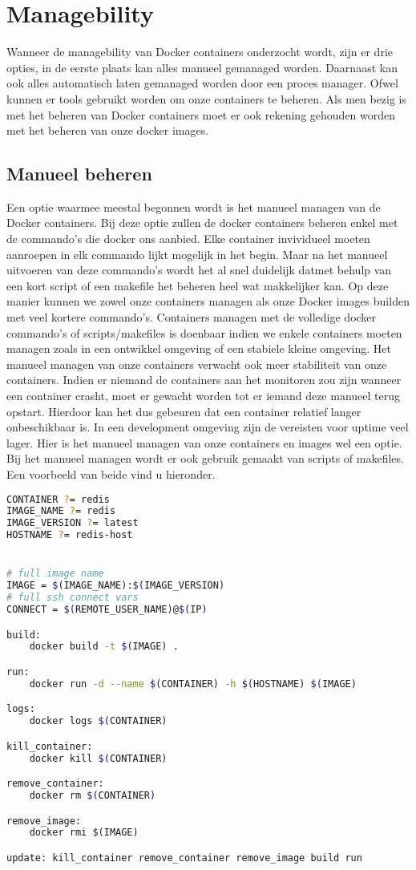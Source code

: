 \chapter{Managebility}

Wanneer de managebility van Docker containers onderzocht wordt, zijn er drie opties, in de eerste plaats kan alles manueel gemanaged worden. Daarnaast kan  ook alles automatisch laten gemanaged worden door een proces manager. Ofwel kunnen er tools gebruikt worden om onze containers te beheren. Als men bezig is met het beheren van Docker containers moet er ook rekening gehouden worden met het beheren van onze docker images. 

\section{Manueel beheren}

Een optie waarmee meestal begonnen wordt is het manueel managen van de Docker containers. Bij deze optie zullen de docker containers beheren enkel met de commando's die docker ons aanbied. Elke container invividueel moeten aanroepen in elk commando lijkt mogelijk in het begin. Maar na het manueel uitvoeren van deze commando's wordt het al snel duidelijk datmet behulp van een kort script of een makefile het beheren heel wat makkelijker kan. Op deze manier kunnen we zowel onze containers managen als onze Docker images builden met veel kortere commando's. Containers managen met de volledige docker commando's of scripts/makefiles is doenbaar indien we enkele containers moeten managen zoals in een ontwikkel omgeving of een stabiele kleine omgeving. Het manueel managen van onze containers verwacht ook meer stabiliteit van onze containers. Indien er niemand de containers aan het monitoren zou zijn wanneer een container crasht, moet er gewacht worden tot er iemand deze manueel terug opstart. Hierdoor kan het dus gebeuren dat een container relatief langer onbeschikbaar is. In een development omgeving zijn de vereisten voor uptime veel lager. Hier is het manueel managen van onze containers en images wel een optie. Bij het manueel managen wordt er ook gebruik gemaakt van scripts of makefiles. Een voorbeeld van beide vind u hieronder.

\begin{lstlisting}[language=bash, style=configstyle]
CONTAINER ?= redis
IMAGE_NAME ?= redis
IMAGE_VERSION ?= latest
HOSTNAME ?= redis-host


# full image name
IMAGE = $(IMAGE_NAME):$(IMAGE_VERSION)
# full ssh connect vars
CONNECT = $(REMOTE_USER_NAME)@$(IP)

build:
	docker build -t $(IMAGE) .

run:
	docker run -d --name $(CONTAINER) -h $(HOSTNAME) $(IMAGE)

logs:
	docker logs $(CONTAINER)

kill_container:
	docker kill $(CONTAINER)

remove_container:
	docker rm $(CONTAINER)

remove_image:
	docker rmi $(IMAGE)

update: kill_container remove_container remove_image build run
\end{lstlisting}

